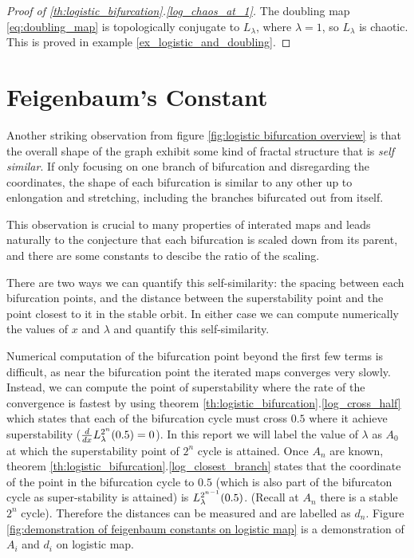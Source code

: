\begin{proof}[Proof of \ref{th:logistic_bifurcation}.\ref{log_chaos_at_1}]
	The doubling map \eqref{eq:doubling_map} is topologically conjugate to $L_{\lambda}$, where $\lambda = 1$, so $L_{\lambda}$ is chaotic.
	This is proved in example \ref{ex_logistic_and_doubling}.
\end{proof}

\section{Feigenbaum's Constant}

Another striking observation from figure \ref{fig:logistic bifurcation overview} is that the overall shape of the graph exhibit some kind of fractal structure that is \emph{self similar}.
If only focusing on one branch of bifurcation and disregarding the coordinates, the shape of each bifurcation is similar to any other up to enlongation and stretching, including the branches bifurcated out from itself.
 
 This observation is crucial to many properties of interated maps and leads naturally to the conjecture that each bifurcation is scaled down from its parent, and there are some constants to descibe the ratio of the scaling. 

 There are two ways we can quantify this self-similarity: the spacing between each bifurcation points, and the distance between the superstability point and the point closest to it in the stable orbit. 
 In either case we can compute numerically the values of $x$ and $\lambda$ and quantify this self-similarity.

 Numerical computation of the bifurcation point beyond the first few terms is difficult, as near the bifurcation point the iterated maps converges very slowly.
 Instead, we can compute the point of superstability where the rate of the convergence is fastest by using theorem \ref{th:logistic_bifurcation}.\ref{log_cross_half} which states that each of the bifurcation cycle must cross $0.5$ where it achieve superstability ($\frac{d}{dx}L_{\lambda}^{2^n}(0.5) = 0$).
In this report we will label the value of $\lambda$ as $A_0$ at which the superstability point of $2^n$ cycle is attained.
Once $A_n$ are known, theorem \ref{th:logistic_bifurcation}.\ref{log_closest_branch} states that the coordinate of the point in the bifurcation cycle to $0.5$ (which is also part of the bifurcaton cycle as super-stability is attained) is $L_{\lambda}^{2^{n-1}}(0.5)$. (Recall at $A_n$ there is a stable $2^n$ cycle).
Therefore the distances can be measured and are labelled as $d_n$.
Figure \ref{fig:demonstration of feigenbaum constants on logistic map} is a demonstration of $A_i$ and $d_i$ on logistic map.

